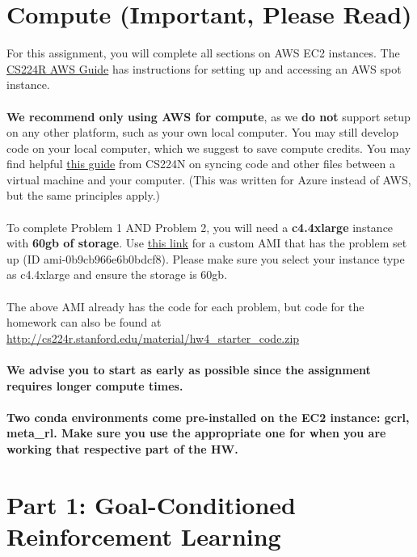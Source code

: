 \documentclass[12pt]{article}
\begin{document}
\section*{Compute (Important, Please Read)}
For this assignment, you will complete all sections on AWS EC2 instances. The \href{https://docs.google.com/document/d/1cu07_OcNSBAFNX95g4FtO5H_kzoPhGbDbOX0UgrUv7M/edit?usp=sharing}{CS224R AWS Guide} has instructions for setting up and accessing an AWS spot instance.\\ 
\\
\textbf{We recommend only using AWS for compute}, as we \textbf{do not} support setup on any other platform, such as your own local computer. You may still develop code on your local computer, which we suggest to save compute credits. You may find helpful \href{https://docs.google.com/document/d/1jtANWXbIYXMZO_2X7jupauPxcEbz-TVJkdatg4gzOdk/edit?tab=t.0#heading=h.e8e13hguv9ns}{this guide} from CS224N on syncing code and other files between a virtual machine and your computer. (This was written for Azure instead of AWS, but the same principles apply.) \\
\\  
To complete Problem 1 AND Problem 2, you will need a \textbf{c4.4xlarge} instance with \textbf{60gb of storage}. Use \href{https://us-west-2.console.aws.amazon.com/ec2/home?region=us-west-2#LaunchInstances:ami=ami-0b9cb966e6b0bdcf8}{this link} for a custom AMI that has the problem set up (ID ami-0b9cb966e6b0bdcf8). Please make sure you select your instance type as c4.4xlarge and ensure the storage is $60$gb.\\
\\
The above AMI already has the code for each problem, but code for the homework can also be found at \url{http://cs224r.stanford.edu/material/hw4_starter_code.zip}\\
\\
\noindent\textbf{We advise you to start as early as possible since the assignment requires longer compute times.}
\\
\\
\noindent\textbf{Two conda environments come pre-installed on the EC2 instance: gcrl, meta\_rl. Make sure you use the appropriate one for when you are working that respective part of the HW.}

\newpage
\section*{Part 1: Goal-Conditioned Reinforcement Learning}
\end{document}

